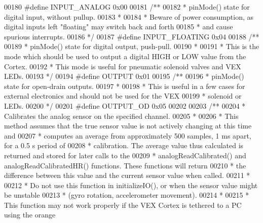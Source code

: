 \begin{DoxyCode}
00180 \textcolor{preprocessor}{#}\textcolor{preprocessor}{define} \textcolor{preprocessor}{INPUT\_ANALOG} 0x00
00181 \textcolor{comment}{/**}
00182 \textcolor{comment}{ * pinMode() state for digital input, without pullup.}
00183 \textcolor{comment}{ *}
00184 \textcolor{comment}{ * Beware of power consumption, as digital inputs left "floating" may switch back and forth}
00185 \textcolor{comment}{ * and cause spurious interrupts.}
00186 \textcolor{comment}{ */}
00187 \textcolor{preprocessor}{#}\textcolor{preprocessor}{define} \textcolor{preprocessor}{INPUT\_FLOATING} 0x04
00188 \textcolor{comment}{/**}
00189 \textcolor{comment}{ * pinMode() state for digital output, push-pull.}
00190 \textcolor{comment}{ *}
00191 \textcolor{comment}{ * This is the mode which should be used to output a digital HIGH or LOW value from the Cortex.}
00192 \textcolor{comment}{ * This mode is useful for pneumatic solenoid valves and VEX LEDs.}
00193 \textcolor{comment}{ */}
00194 \textcolor{preprocessor}{#}\textcolor{preprocessor}{define} \textcolor{preprocessor}{OUTPUT} 0x01
00195 \textcolor{comment}{/**}
00196 \textcolor{comment}{ * pinMode() state for open-drain outputs.}
00197 \textcolor{comment}{ *}
00198 \textcolor{comment}{ * This is useful in a few cases for external electronics and should not be used for the VEX}
00199 \textcolor{comment}{ * solenoid or LEDs.}
00200 \textcolor{comment}{ */}
00201 \textcolor{preprocessor}{#}\textcolor{preprocessor}{define} \textcolor{preprocessor}{OUTPUT\_OD} 0x05
00202 
00203 \textcolor{comment}{/**}
00204 \textcolor{comment}{ * Calibrates the analog sensor on the specified channel.}
00205 \textcolor{comment}{ *}
00206 \textcolor{comment}{ * This method assumes that the true sensor value is not actively changing at this time and}
00207 \textcolor{comment}{ * computes an average from approximately 500 samples, 1 ms apart, for a 0.5 s period of}
00208 \textcolor{comment}{ * calibration. The average value thus calculated is returned and stored for later calls to the}
00209 \textcolor{comment}{ * analogReadCalibrated() and analogReadCalibratedHR() functions. These functions will return}
00210 \textcolor{comment}{ * the difference between this value and the current sensor value when called.}
00211 \textcolor{comment}{ *}
00212 \textcolor{comment}{ * Do not use this function in initializeIO(), or when the sensor value might be unstable}
00213 \textcolor{comment}{ * (gyro rotation, accelerometer movement).}
00214 \textcolor{comment}{ *}
00215 \textcolor{comment}{ * This function may not work properly if the VEX Cortex is tethered to a PC using the orange}

\end{DoxyCode}
